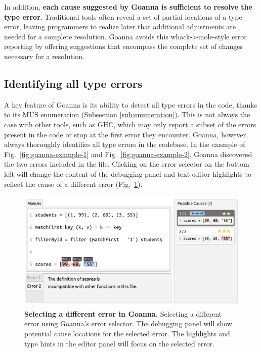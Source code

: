 \documentclass[pdflatex,lineno,sn-nature,Numbered]{sn-jnl}%
\begin{document}
    
    In addition, {\bf each cause suggested by Goanna is sufficient to resolve the type error}. Traditional tools often reveal a set of partial locations of a type error, leaving programmers to realize later that additional adjustments are needed for a complete resolution. Goanna avoids this whack-a-mole-style error reporting by offering suggestions that encompass the complete set of changes necessary for a resolution.
    
    \subsection{Identifying all type errors} \label{sub:all-errors}
    
    A key feature of Goanna is its ability to detect all type errors in the code, thanks to its MUS enumeration (Subsection \ref{sub:enumeration}). This is not always the case with other tools, such as GHC, which may only report a subset of the errors present in the code or stop at the first error they encounter. Goanna, however, always thoroughly identifies all type errors in the codebase. In the example of Fig.~\ref{fig:goanna-example-1} and Fig.~\ref{fig:goanna-example-2}, Goanna discovered the two errors included in the file. Clicking on the error selector on the bottom left will change the content of the debugging panel and text editor highlights to reflect the cause of a different error (Fig.~\ref{fig:multi-error}). 

    \begin{figure}[ht!]
        \centering
        \includegraphics[width=\linewidth]{images/Goanna-Multi-Error.pdf}
        \caption[Selecting a different error in Goanna]{\textbf{Selecting a different error in Goanna.} Selecting a different error using Goanna's error selector. The debugging panel will show potential cause locations for the selected error. The highlights and type hints in the editor panel will focus on the selected error.}
        \label{fig:multi-error}
    \end{figure}
\end{document}
